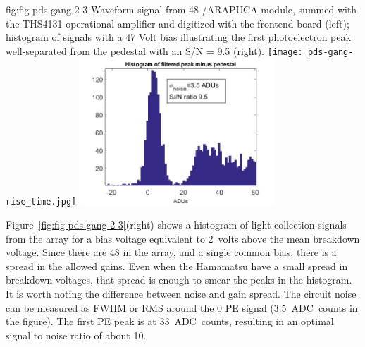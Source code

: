 

\begin{dunefigure}
 {fig:fig-pds-gang-2-3}
 {Waveform signal from 48 /ARAPUCA module, summed with the THS4131 operational amplifier and digitized with the  frontend board (left); histogram of signals with a 47 Volt bias illustrating the first photoelectron peak well-separated from the pedestal with an S/N = 9.5 (right).}
\texttt{[image: pds-gang-rise\_time.jpg]}
\includegraphics[height=5.5cm]{graphics/pds-gang48-47v.jpg}
\end{dunefigure}

Figure~\ref{fig:fig-pds-gang-2-3}(right) shows a histogram of light collection signals from the array for a bias voltage equivalent to \SI{2}{volts} above the mean breakdown voltage. Since there are 48  in the array, and a single common bias, there is a spread in the allowed gains. Even when the Hamamatsu  have a small spread in breakdown voltages, that spread is enough to smear the peaks in the histogram. It is worth noting the difference between noise and gain spread. The circuit noise can be measured as FWHM or RMS around the 0 PE signal (\SI{3.5}{ADC counts} in the figure). The first PE peak is at \SI{33}{ADC counts}, resulting in an optimal signal to noise ratio of about 10.

